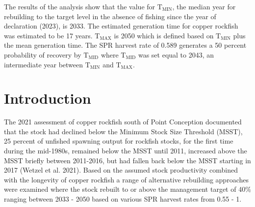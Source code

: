 \documentclass[11pt,
  english,
  a4paper,
]{article}
\begin{document}
\leavevmode\tagmcend\tagstructend\par


The results of the analysis show that the value for {\(\text{T}_\text{MIN}\)\leavevmode\tagmcend\tagstructend}, the median year for rebuilding to the target level in the absence of fishing since the year of declaration (2023), is 2033. The estimated generation time for copper rockfish was estimated to be 17 years. {\(\text{T}_\text{MAX}\)\leavevmode\tagmcend\tagstructend} is 2050 which is defined based on {\(\text{T}_\text{MIN}\)\leavevmode\tagmcend\tagstructend} plus the mean generation time. The SPR harvest rate of 0.589 generates a 50 percent probability of recovery by {\(\text{T}_\text{MID}\)\leavevmode\tagmcend\tagstructend} where {\(\text{T}_\text{MID}\)\leavevmode\tagmcend\tagstructend} was set equal to 2043, an intermediate year between {\(\text{T}_\text{MIN}\)\leavevmode\tagmcend\tagstructend} and {\(\text{T}_\text{MAX}\)\leavevmode\tagmcend\tagstructend}.

\leavevmode\tagmcend\tagstructend\par

\pagebreak
\setlength{\parskip}{5mm plus1mm minus1mm}
\setcounter{page}{1}
\renewcommand{\thefigure}{\arabic{figure}}
\renewcommand{\thetable}{\arabic{table}}
\setcounter{table}{0}
\setcounter{figure}{0}

\setlength\parskip{0.2em plus 0.1em minus 0.2em}


\hypertarget{introduction}{%
\section{Introduction}\label{introduction}}

\leavevmode\tagmcend\tagstructend


The 2021 assessment of copper rockfish south of Point Conception documented that the stock had declined below the Minimum Stock Size Threshold (MSST), 25 percent of unfished spawning output for rockfish stocks, for the first time during the mid-1980s, remained below the MSST until 2011, increased above the MSST briefly between 2011-2016, but had fallen back below the MSST starting in 2017 {(Wetzel et al. 2021)\leavevmode\tagmcend\tagstructend}. Based on the assumed stock productivity combined with the longevity of copper rockfish a range of alternative rebuilding approaches were examined where the stock rebuilt to or above the management target of 40\% ranging between 2033 - 2050 based on various SPR harvest rates from 0.55 - 1.
\end{document}
